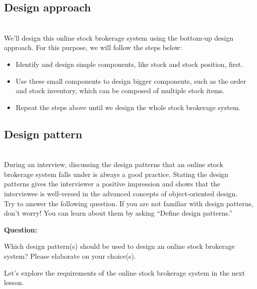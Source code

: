 \subsection{Design approach}\label{AvFkqX_uBnryIUoPxD7XV}
\\
We'll design this online stock brokerage system using the bottom-up design approach. For this purpose, we will follow the steps below:

\begin{itemize}
\item
Identify and design simple components, like stock and stock position, first.
\item
Use these small components to design bigger components, such as the order and stock inventory, which can be composed of multiple stock items.
\item
Repeat the steps above until we design the whole stock brokerage system.
\end{itemize}

\subsection{Design pattern~}\label{I9TiD23Ux3o1GCM4ZFKky}
\\
During an interview, discussing the design patterns that an online stock brokerage system falls under is always a good practice. Stating the design patterns gives the interviewer a positive impression and shows that the interviewee is well-versed in the advanced concepts of object-oriented design.
\\
Try to answer the following question. If you are not familiar with design patterns, don't worry! You can learn about them by asking ``Define design patterns.''

\textbf{Question:}

Which design pattern(s) should be used to design an online stock brokerage system? Please elaborate on your choice(s).

Let's explore the requirements of the online stock brokerage system in the next lesson.

